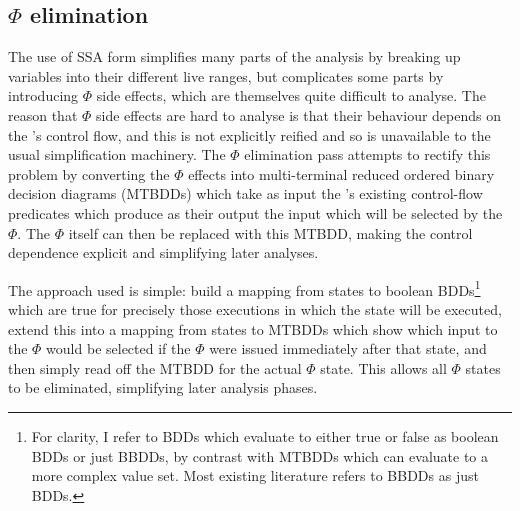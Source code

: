 \subsection{$\Phi$ elimination}
\label{sect:phi_elimination}

The use of SSA form simplifies many parts of the analysis by breaking
up variables into their different live ranges, but complicates some
parts by introducing $\Phi$ side effects, which are themselves quite
difficult to analyse.  The reason that $\Phi$ side effects are hard to
analyse is that their behaviour depends on the {\StateMachine}'s
control flow, and this is not explicitly reified and so is unavailable
to the usual simplification machinery.  The $\Phi$ elimination pass
attempts to rectify this problem by converting the $\Phi$ effects into
multi-terminal reduced ordered binary decision
diagrams\needCite{}  (MTBDDs) which take as input the
{\StateMachine}'s existing control-flow predicates which produce as
their output the input which will be selected by the $\Phi$.  The
$\Phi$ itself can then be replaced with this MTBDD, making the control
dependence explicit and simplifying later analyses.




The approach used is simple: build a mapping from {\StateMachine}
states to boolean BDDs\footnote{For clarity, I refer to BDDs which
  evaluate to either true or false as boolean BDDs or just BBDDs, by
  contrast with MTBDDs which can evaluate to a more complex value set.
  Most existing literature refers to BBDDs as just BDDs.}  which are
true for precisely those executions in which the state will be
executed, extend this into a mapping from states to MTBDDs which show
which input to the $\Phi$ would be selected if the $\Phi$ were issued
immediately after that state, and then simply read off the MTBDD for
the actual $\Phi$ state.  This allows all $\Phi$ states to be
eliminated, simplifying later analysis phases.

